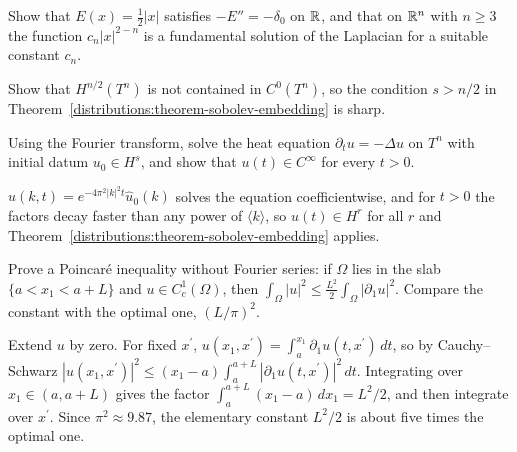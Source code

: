 \begin{exercise}\label{distributions:exercise-fundamental-solution}
Show that $E(x) = \frac{1}{2}|x|$ satisfies $-E'' = -\delta_0$ on $\mathbb{R}$, and that on $\mathbb{R}^n$ with $n \geq 3$ the function $c_n|x|^{2-n}$ is a fundamental solution of the Laplacian for a suitable constant
$c_n$.
\end{exercise}

\begin{exercise}\label{distributions:exercise-sobolev-sharp}
Show that $H^{n/2}(T^n)$ is not contained in $C^0(T^n)$, so the condition $s > n/2$ in Theorem~\ref{distributions:theorem-sobolev-embedding} is sharp.
\end{exercise}

\begin{exercise}\label{distributions:exercise-heat-kernel}
Using the Fourier transform, solve the heat equation $\partial_tu = -\Delta u$ on $T^n$ with initial datum $u_0 \in H^s$, and show that $u(t) \in C^\infty$ for every $t > 0$.
\end{exercise}

\begin{solution}
$\hat u(k, t) = e^{-4\pi^2|k|^2t}\hat u_0(k)$ solves the equation coefficientwise, and for $t > 0$ the factors decay faster than any power of $\langle k\rangle$, so $u(t) \in H^r$ for all $r$ and
Theorem~\ref{distributions:theorem-sobolev-embedding} applies.
\end{solution}

\begin{exercise}\label{distributions:exercise-poincare-elementary}
Prove a Poincar\'e inequality without Fourier series: if $\Omega$ lies in the slab $\{a < x_1 < a + L\}$ and $u \in C^1_c(\Omega)$, then $\int_\Omega|u|^2 \leq \frac{L^2}{2}\int_\Omega|\partial_1u|^2$.
Compare the constant with the optimal one, $(L/\pi)^2$.
\end{exercise}

\begin{solution}
Extend $u$ by zero. For fixed $x^{\prime}$, $u(x_1, x^{\prime}) = \int_a^{x_1}\partial_1u(t, x^{\prime})\,dt$, so by Cauchy--Schwarz $|u(x_1, x^{\prime})|^2 \leq (x_1 - a)\int_a^{a+L}|\partial_1u(t, x^{\prime})|^2\,dt$.
Integrating over $x_1 \in (a, a + L)$ gives the factor $\int_a^{a+L}(x_1 - a)\,dx_1 = L^2/2$, and then integrate over $x^{\prime}$. Since $\pi^2 \approx 9.87$, the elementary constant $L^2/2$ is about five times
the optimal one.
\end{solution}

